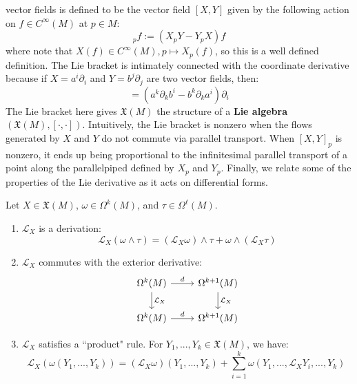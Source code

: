 vector fields is defined to be the vector field $[X, Y]$ given by the following action on $f\in C^\infty(M)$ at $p\in M$:
\begin{equation}
	[X, Y]_p f := (X_p Y - Y_p X) f
\end{equation}
where note that $X(f)\in C^\infty(M), p\mapsto X_p(f)$, so this is a well defined definition. The Lie bracket is 
intimately connected with the coordinate derivative because if $X = a^i\partial_i$ and $Y = b^j\partial_j$ are two vector 
fields, then:
\begin{equation}
	[X, Y] = \left(a^k\partial_k b^i - b^k\partial_k a^i\right)\partial_i
\end{equation}
The Lie bracket here gives $\mathfrak X(M)$ the structure of a \textbf{Lie algebra} $\left(\mathfrak X(M), [\cdot, \cdot]\right)$. 
Intuitively, the Lie bracket is nonzero when the flows generated by $X$ and $Y$ do not commute via parallel transport. When 
$[X, Y]_p$ is nonzero, it ends up being proportional to the infinitesimal parallel transport of a point along the parallelpiped 
defined by $X_p$ and $Y_p$. Finally, we relate some of the properties of the Lie derivative as it acts on differential forms. 

\begin{theorem}
	Let $X\in\mathfrak X(M)$, $\omega\in\Omega^k(M)$, and $\tau\in\Omega^\ell(M)$. 
	\begin{enumerate}
		\item $\mathcal L_X$ is a derivation:
		\begin{equation}
			\mathcal L_X(\omega\wedge\tau) = (\mathcal L_X\omega)\wedge\tau + \omega\wedge(\mathcal L_X\tau)
		\end{equation}
		
		\item $\mathcal L_X$ commutes with the exterior derivative:
		\begin{equation}\begin{tikzcd}
			\Omega^k(M)\arrow[d, "\mathcal L_X"]\arrow[r, "d"] & \Omega^{k + 1}(M)\arrow[d, "\mathcal L_X"] \\
			\Omega^k(M)\arrow[r, "d"] & \Omega^{k + 1}(M)
		\end{tikzcd}\end{equation}
		
		\item $\mathcal L_X$ satisfies a ``product" rule. For $Y_1, ..., Y_k\in\mathfrak X(M)$, we have:
		\begin{equation}
			\mathcal L_X(\omega(Y_1, ..., Y_k)) = (\mathcal L_X\omega)(Y_1, ..., Y_k) + \sum_{i = 1}^k\omega(Y_1, ..., 
			\mathcal L_X Y_i, ..., Y_k)~
			\label{eq:lie_derivative_global}
		\end{equation}
	\end{enumerate}
\end{theorem}

